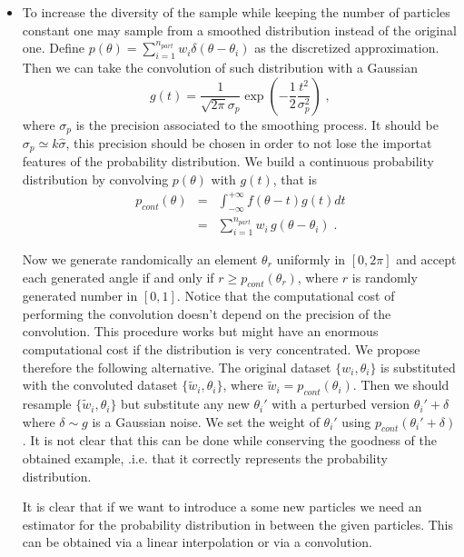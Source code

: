 \documentclass[aps, pra, 10pt, twocolumn, superscriptaddress,floatfix]{revtex4-1}
\begin{document}
\begin{itemize}
	\item To increase the diversity of the sample while keeping the number of particles constant one may sample from a smoothed distribution instead of the original one. Define $p(\theta) = \sum_{i=1}^{n_{part}} w_i \delta \left(\theta - \theta_i \right)$ as the discretized approximation. Then we can take the convolution of such distribution with a Gaussian 
	\begin{equation}
		g(t) = \frac{1}{\sqrt{2 \pi} \sigma_p} \exp \left( -\frac{1}{2} \frac{t^2}{\sigma_p^2} \right) \; ,
	\end{equation}
	where $\sigma_p$ is the precision associated to the smoothing process. It should be $\sigma_p \simeq k \hat{\sigma}$, this precision should be chosen in order to not lose the importat features of the probability distribution. We build a continuous probability distribution by convolving $p(\theta)$ with $g(t)$, that is
	\begin{eqnarray}
		p_{cont} (\theta) &=& \int_{-\infty}^{+\infty} f(\theta-t) g(t) d t \\ &=& \sum_{i=1}^{n_{part}} w_i \, g(\theta - \theta_i) \; .
	\end{eqnarray}
	
	 Now we generate randomically an element $\theta_{r}$ uniformly in $\left[0, 2 \pi \right]$ and accept each generated angle if and only if $r \ge p_{cont} (\theta_r)$, where $r$ is randomly generated number in $\left[0, 1 \right]$. Notice that the computational cost of performing the convolution doesn't depend on the precision of the convolution. This procedure works but might have an enormous computational cost if the distribution is very concentrated. We propose therefore the following alternative. The original dataset $\lbrace w_i, \theta_i \rbrace$ is substituted with the convoluted dataset $\lbrace \tilde{w}_i, \theta_i \rbrace$, where $\tilde{w}_i = p_{cont} (\theta_i)$. Then we should resample $\lbrace \tilde{w}_i, \theta_i \rbrace$ but substitute any new $\theta_i'$ with a perturbed version $\theta_i' + \delta$ where $\delta \sim g$ is a Gaussian noise. We set the weight of $\theta_i'$ using  $p_{cont} (\theta_i'+\delta)$. It is not clear that this can be done while conserving the goodness of the obtained example, .i.e. that it correctly represents the probability distribution.
	 
	 It is clear that if we want to introduce a some new particles we need an estimator for the probability distribution in between the given particles. This can be obtained via a linear interpolation or via a convolution.
	 

\end{itemize}
\end{document}
